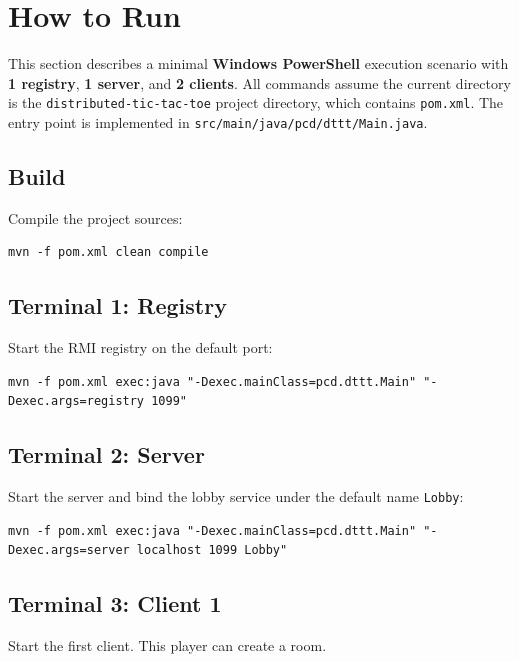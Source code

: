 \clearpage
\section{How to Run}

This section describes a minimal \textbf{Windows PowerShell} execution
scenario with \textbf{1 registry}, \textbf{1 server}, and \textbf{2 clients}.
All commands assume the current directory is the
\texttt{distributed-tic-tac-toe} project directory, which contains
\texttt{pom.xml}. The entry point is implemented in
\texttt{src/main/java/pcd/dttt/Main.java}.

\subsection{Build}

Compile the project sources:

\begin{lstlisting}[style=codestyle]
mvn -f pom.xml clean compile
\end{lstlisting}

\subsection{Terminal 1: Registry}

Start the RMI registry on the default port:

\begin{lstlisting}[style=codestyle]
mvn -f pom.xml exec:java "-Dexec.mainClass=pcd.dttt.Main" "-Dexec.args=registry 1099"
\end{lstlisting}

\subsection{Terminal 2: Server}

Start the server and bind the lobby service under the default name
\texttt{Lobby}:

\begin{lstlisting}[style=codestyle]
mvn -f pom.xml exec:java "-Dexec.mainClass=pcd.dttt.Main" "-Dexec.args=server localhost 1099 Lobby"
\end{lstlisting}

\subsection{Terminal 3: Client 1}

Start the first client. This player can create a room.

